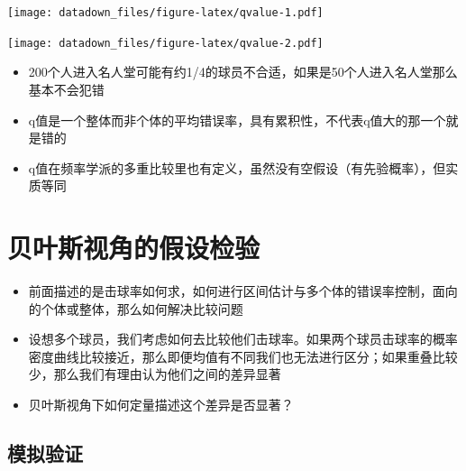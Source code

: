\documentclass[]{book}
\newenvironment{Shaded}{\begin{snugshade}}{\end{snugshade}}
\newcommand{\CommentTok}[1]{\textcolor[rgb]{0.56,0.35,0.01}{\textit{#1}}}
\newcommand{\FloatTok}[1]{\textcolor[rgb]{0.00,0.00,0.81}{#1}}
\newcommand{\KeywordTok}[1]{\textcolor[rgb]{0.13,0.29,0.53}{\textbf{#1}}}
\newcommand{\NormalTok}[1]{#1}
\newcommand{\OperatorTok}[1]{\textcolor[rgb]{0.81,0.36,0.00}{\textbf{#1}}}
\newcommand{\StringTok}[1]{\textcolor[rgb]{0.31,0.60,0.02}{#1}}
\begin{document}
\texttt{[image: datadown\_files/figure-latex/qvalue-1.pdf]}

\begin{Shaded}
\end{Shaded}

\texttt{[image: datadown\_files/figure-latex/qvalue-2.pdf]}

\begin{itemize}
\item
  200个人进入名人堂可能有约1/4的球员不合适，如果是50个人进入名人堂那么基本不会犯错
\item
  q值是一个整体而非个体的平均错误率，具有累积性，不代表q值大的那一个就是错的
\item
  q值在频率学派的多重比较里也有定义，虽然没有空假设（有先验概率），但实质等同
\end{itemize}

\section{贝叶斯视角的假设检验}

\begin{itemize}
\item
  前面描述的是击球率如何求，如何进行区间估计与多个体的错误率控制，面向的个体或整体，那么如何解决比较问题
\item
  设想多个球员，我们考虑如何去比较他们击球率。如果两个球员击球率的概率密度曲线比较接近，那么即便均值有不同我们也无法进行区分；如果重叠比较少，那么我们有理由认为他们之间的差异显著
\item
  贝叶斯视角下如何定量描述这个差异是否显著？
\end{itemize}

\subsection{模拟验证}
\end{document}
